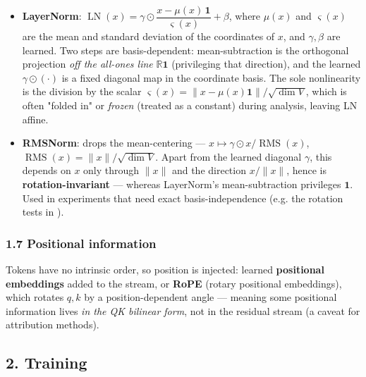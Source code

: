 \begin{itemize}
\item \textbf{LayerNorm}: $\operatorname{LN}(x) = \gamma \odot \dfrac{x - \mu(x)\,\mathbf 1}{\varsigma(x)} + \beta$, where $\mu(x)$ and $\varsigma(x)$ are the mean and standard deviation of the coordinates of $x$, and $\gamma,\beta$ are learned. Two steps are basis-dependent: mean-subtraction is the orthogonal projection \emph{off the all-ones line} $\mathbb{R}\mathbf 1$ (privileging that direction), and the learned $\gamma\odot(\cdot)$ is a fixed diagonal map in the coordinate basis. The sole nonlinearity is the division by the scalar $\varsigma(x) = \|x - \mu(x)\mathbf 1\|/\sqrt{\dim V}$, which is often "folded in" or \emph{frozen} (treated as a constant) during analysis, leaving LN affine.
\item \textbf{RMSNorm}: drops the mean-centering --- $x \mapsto \gamma \odot x / \operatorname{RMS}(x)$, $\operatorname{RMS}(x)=\|x\|/\sqrt{\dim V}$. Apart from the learned diagonal $\gamma$, this depends on $x$ only through $\|x\|$ and the direction $x/\|x\|$, hence is \textbf{rotation-invariant} --- whereas LayerNorm's mean-subtraction privileges $\mathbf 1$. Used in experiments that need exact basis-independence (e.g. the rotation tests in \textcite{privileged-bases-residual-stream}).
\end{itemize}

\subsubsection*{1.7 Positional information}
Tokens have no intrinsic order, so position is injected: learned \textbf{positional embeddings} added to the stream, or \textbf{RoPE} (rotary positional embeddings), which rotates $q,k$ by a position-dependent angle --- meaning some positional information lives \emph{in the QK bilinear form}, not in the residual stream (a caveat for attribution methods).



\subsection*{2. Training}

